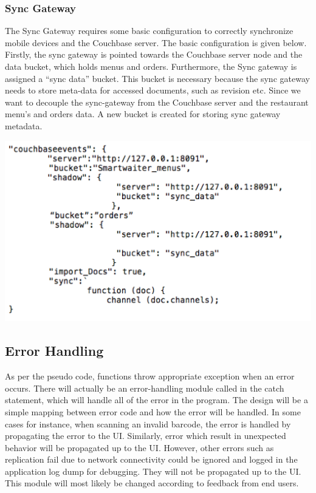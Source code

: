 \documentclass[12pt, titlepage]{article}
\begin{document}
\subsubsection{Sync Gateway}

The Sync Gateway requires some basic configuration to correctly synchronize mobile devices and the Couchbase server. The basic configuration is given below. Firstly, the sync gateway is pointed towards the Couchbase server node and the data bucket, which holds menus and orders. Furthermore, the Sync gateway is assigned a “sync data” bucket. This bucket is necessary because the sync gateway needs to store meta-data for accessed documents, such as revision etc. Since we want to decouple the sync-gateway from the Couchbase server and the restaurant menu’s and orders data. A new bucket is created for storing sync gateway metadata. 

\includegraphics[width=150mm,scale=0.5]{jsonCouchbase.png}

\subsection{Error Handling}

As per the pseudo code, functions throw appropriate exception when an error occurs. There will actually be an error-handling module called in the catch statement, which will handle all of the error in the program.  The design will be a simple mapping between error code and how the error will be handled. In some cases for instance, when scanning an invalid barcode, the error is handled by propagating the error to the UI. Similarly, error which result in unexpected behavior will be propagated up to the UI. However, other errors such as replication fail due to network connectivity could be ignored and logged in the application log dump for debugging. They will not be propagated up to the UI. This module will most likely be changed according to feedback from end users.
\end{document}
